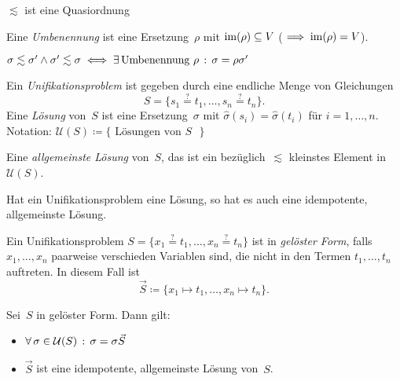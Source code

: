 \documentclass{cheat-sheet}
\newcommand{\Unifiers}{\mathcal{U}} %
\begin{document}
\begin{lem}
  $\lesssim$ ist eine Quasiordnung
\end{lem}

\begin{defn}
  Eine \emph{Umbenennung} ist eine Ersetzung~$\rho$ mit $\operatorname{im}(\rho) \subseteq V$ ($\implies \operatorname{im}(\rho) = V$).
\end{defn}

\begin{lem}
  $\sigma \lesssim \sigma' \wedge \sigma' \lesssim \sigma \iff \exists \, {\text{Umbenennung~$\rho$}} \,:\, \sigma = \rho \sigma'$
\end{lem}

\begin{defn}
  Ein \emph{Unifikationsproblem} ist gegeben durch eine endliche Menge von Gleichungen
  \[
    S = \{ s_1 \overset{?}= t_1, \ldots, s_n \overset{?}= t_n \}.
  \]
  Eine \textit{Lösung} von~$S$ ist eine Ersetzung~$\sigma$ mit $\hat{\sigma}(s_i) = \hat{\sigma}(t_i)$ für $i = 1, \ldots, n$.
  Notation: $\Unifiers(S) \coloneqq \{ \text{ Lösungen von~$S$ } \}$
\end{defn}

\begin{gesucht}
  Eine \emph{allgemeinste Lösung} von~$S$, das ist ein bezüglich~$\lesssim$ kleinstes Element in~$\Unifiers(S)$.
\end{gesucht}

\begin{thm}
  Hat ein Unifikationsproblem eine Lösung, so hat es auch eine idempotente, allgemeinste Lösung.
\end{thm}


\begin{defn}
  Ein Unifikationsproblem $S = \{ x_1 \overset{?}= t_1, \ldots, x_n \overset{?}= t_n \}$ ist in \emph{gelöster Form}, falls $x_1, \ldots, x_n$ paarweise verschieden Variablen sind, die nicht in den Termen $t_1, \ldots, t_n$ auftreten.
  In diesem Fall ist
  \[
    \vec{S} \coloneqq \{ x_1 \mapsto t_1, \ldots, x_n \mapsto t_n \}.
  \]
\end{defn}

\begin{lem}
  Sei~$S$ in gelöster Form.
  Dann gilt:
  \begin{itemize}
    \item $\fa{\sigma \in \Unifiers(S)} \sigma = \sigma \vec{S}$
    \item $\vec{S}$ ist eine idempotente, allgemeinste Lösung von~$S$.
  \end{itemize}
\end{lem}
\end{document}
